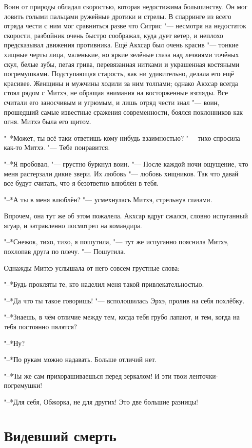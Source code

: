 Воин от природы обладал скоростью, которая недостижима большинству.
Он мог ловить голыми пальцами ружейные дротики и стрелы.
В спарринге из всего отряда чести с ним мог сравниться разве что Ситрис "--- несмотря на недостаток скорости, разбойник очень быстро соображал, куда дует ветер, и неплохо предсказывал движения противника.
Ещё Акхсар был очень красив "--- тонкие хищные черты лица, маленькие, но яркие зелёные глаза над лезвиями точёных скул, белые зубы, пегая грива, перевязанная нитками и украшенная костяными погремушками.
Подступающая старость, как ни удивительно, делала его ещё красивее.
Женщины и мужчины ходили за ним толпами;
однако Акхсар всегда стоял рядом с Митхэ, не обращая внимания на восторженные взгляды.
Все считали его заносчивым и угрюмым, и лишь отряд чести знал "--- воин, прошедший самые известные сражения современности, боялся поклонников как огня.
Митхэ была его щитом.

"--*Может, ты всё-таки ответишь кому-нибудь взаимностью? "--- тихо спросила как-то Митхэ.
"--- Тебе понравится.

"--*Я пробовал, "--- грустно буркнул воин.
"--- После каждой ночи ощущение, что меня растерзали дикие звери.
Их любовь "--- любовь хищников.
Так что давай все будут считать, что я безответно влюблён в тебя.

"--*А ты в меня влюблён? "--- усмехнулась Митхэ, стрельнув глазами.

Впрочем, она тут же об этом пожалела.
Акхсар вдруг сжался, словно испуганный ягуар, и затравленно посмотрел на командира.

"--*Снежок, тихо, тихо, я пошутила, "--- тут же испуганно пояснила Митхэ, похлопав друга по плечу.
"--- Пошутила.

Однажды Митхэ услышала от него совсем грустные слова:

"--*Будь прокляты те, кто наделил меня такой привлекательностью.

"--*Да что ты такое говоришь! "--- всполошилась Эрхэ, пролив на себя похлёбку.

"--*Знаешь, в чём отличие между тем, когда тебя грубо лапают, и тем, когда на тебя постоянно пялятся?

"--*Ну?

"--*По рукам можно надавать.
Больше отличий нет.

"--*Ты же сам прихорашиваешься перед зеркалом!
И эти твои ленточки-погремушки!

"--*Для себя, Обжорка, не для других!
Это две большие разницы!

\section{Видевший смерть}

